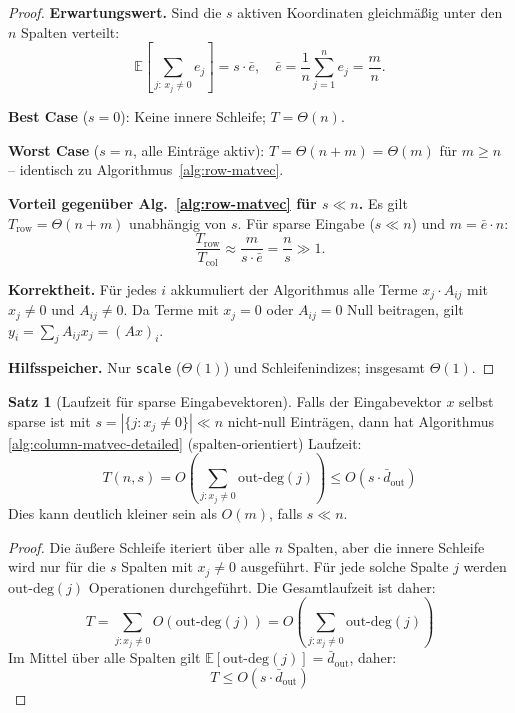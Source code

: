 \documentclass[a4paper,12pt]{report}
\theoremstyle{definition}
\newtheorem{satz}{Satz}
\begin{document}
\begin{proof}
		\textbf{Erwartungswert.} Sind die $s$ aktiven Koordinaten gleichmäßig unter den $n$ Spalten verteilt:
		\[
			\mathbb{E}\!\left[\sum_{j:\,x_j \neq 0} e_j\right] = s \cdot \bar{e},
			\quad \bar{e} = \frac{1}{n}\sum_{j=1}^n e_j = \frac{m}{n}.
		\]

		\textbf{Best Case} ($s = 0$): Keine innere Schleife; $T = \Theta(n)$.

		\textbf{Worst Case} ($s = n$, alle Einträge aktiv): $T = \Theta(n + m) = \Theta(m)$ für $m \geq n$ -- identisch zu Algorithmus~\ref{alg:row-matvec}.

		\textbf{Vorteil gegenüber Alg.~\ref{alg:row-matvec} für $s \ll n$.} Es gilt
		$T_{\mathrm{row}} = \Theta(n + m)$ unabhängig von $s$.
		Für sparse Eingabe ($s \ll n$) und $m = \bar{e} \cdot n$:
		\[
			\frac{T_{\mathrm{row}}}{T_{\mathrm{col}}} \approx \frac{m}{s \cdot \bar{e}} = \frac{n}{s} \gg 1.
		\]

		\textbf{Korrektheit.} Für jedes $i$ akkumuliert der Algorithmus alle Terme $x_j \cdot A_{ij}$ mit $x_j \neq 0$ und $A_{ij} \neq 0$. Da Terme mit $x_j = 0$ oder $A_{ij} = 0$ Null beitragen, gilt $y_i = \sum_j A_{ij} x_j = (Ax)_i$.

		\textbf{Hilfsspeicher.} Nur \texttt{scale} ($\Theta(1)$) und Schleifenindizes; insgesamt $\Theta(1)$.
	\end{proof}

	\begin{satz}[Laufzeit für sparse Eingabevektoren]
		Falls der Eingabevektor $x$ selbst sparse ist mit $s = |\{j : x_j \neq 0\}| \ll n$ nicht-null Einträgen, dann hat Algorithmus \ref{alg:column-matvec-detailed} (spalten-orientiert) Laufzeit:
		\[
		T(n,s) = O\left(\sum_{j: x_j \neq 0} \text{out-deg}(j)\right) \leq O(s \cdot \bar{d}_{\text{out}})
		\]
		Dies kann deutlich kleiner sein als $O(m)$, falls $s \ll n$.
	\end{satz}
	
	\begin{proof}
		Die äußere Schleife iteriert über alle $n$ Spalten, aber die innere Schleife wird nur für die $s$ Spalten mit $x_j \neq 0$ ausgeführt. Für jede solche Spalte $j$ werden $\text{out-deg}(j)$ Operationen durchgeführt. Die Gesamtlaufzeit ist daher:
		\[
		T = \sum_{j: x_j \neq 0} O(\text{out-deg}(j)) = O\left(\sum_{j: x_j \neq 0} \text{out-deg}(j)\right)
		\]
		Im Mittel über alle Spalten gilt $\mathbb{E}[\text{out-deg}(j)] = \bar{d}_{\text{out}}$, daher:
		\[
		T \leq O(s \cdot \bar{d}_{\text{out}})
		\]
	\end{proof}
	
\end{document}
